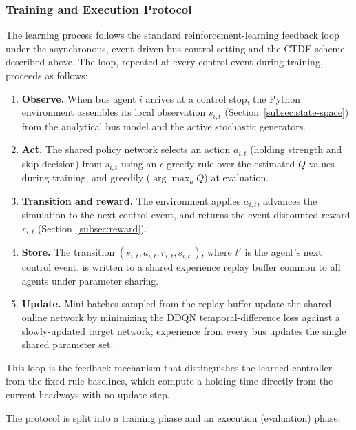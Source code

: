 \subsubsection{Training and Execution Protocol}

The learning process follows the standard reinforcement-learning feedback loop under the asynchronous, event-driven bus-control setting and the CTDE scheme described above. The loop, repeated at every control event during training, proceeds as follows:

\begin{enumerate}
\item \textbf{Observe.} When bus agent $i$ arrives at a control stop, the Python environment assembles its local observation $s_{i,t}$ (Section~\ref{subsec:state-space}) from the analytical bus model and the active stochastic generators.
\item \textbf{Act.} The shared policy network selects an action $a_{i,t}$ (holding strength and skip decision) from $s_{i,t}$ using an $\epsilon$-greedy rule over the estimated $Q$-values during training, and greedily ($\arg\max_a Q$) at evaluation.
\item \textbf{Transition and reward.} The environment applies $a_{i,t}$, advances the simulation to the next control event, and returns the event-discounted reward $r_{i,t}$ (Section~\ref{subsec:reward}).
\item \textbf{Store.} The transition $(s_{i,t}, a_{i,t}, r_{i,t}, s_{i,t'})$, where $t'$ is the agent's next control event, is written to a shared experience replay buffer common to all agents under parameter sharing.
\item \textbf{Update.} Mini-batches sampled from the replay buffer update the shared online network by minimizing the DDQN temporal-difference loss against a slowly-updated target network; experience from every bus updates the single shared parameter set.
\end{enumerate}

This loop is the feedback mechanism that distinguishes the learned controller from the fixed-rule baselines, which compute a holding time directly from the current headways with no update step.

The protocol is split into a training phase and an execution (evaluation) phase:

